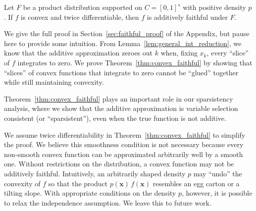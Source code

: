 \begin{theorem}
\label{thm:convex_faithful}
Let $F$ be a product distribution supported on $C=[0,1]^s$ with positive density $p$. If $f$ is convex and twice differentiable, then $f$ is additively faithful under $F$.
\end{theorem}

We give the full proof in Section~\ref{sec:faithful_proof} of the
Appendix, but pause here to provide some intuition. From
Lemma~\ref{lem:general_int_reduction}, we know that the
additive approximation zeroes out $k$ when, fixing $x_k$, every
``slice'' of $f$ integrates to zero. We prove
Theorem~\ref{thm:convex_faithful} by showing that ``slices'' of convex
functions that integrate to zero cannot be ``glued'' together while
still maintaining convexity.

Theorem~\ref{thm:convex_faithful} plays an important role in our
sparsistency analysis, where we show that the additive
approximation is variable selection consistent (or ``sparsistent''), even when the true function is not
additive.

\begin{remark}
  We assume twice differentiability in
  Theorem~\ref{thm:convex_faithful} to simplify the proof. We believe
  this smoothness condition is not necessary because every non-smooth
  convex function can be approximated arbitrarily well by a smooth
  one.  Without restrictions on the distribution, a convex
  function may not be additively faithful. Intuitively, an arbitrarily shaped
  density $p$
  may ``undo'' the convexity of $f$ so that the product
  $p(\mathbf{x}) \, f(\mathbf{x})$ resembles an egg carton or a
  tilting slope.  With appropriate conditions on the density $p$,
  however, it is possible to relax the independence assumption.  We leave this to
  future work.
\end{remark}

